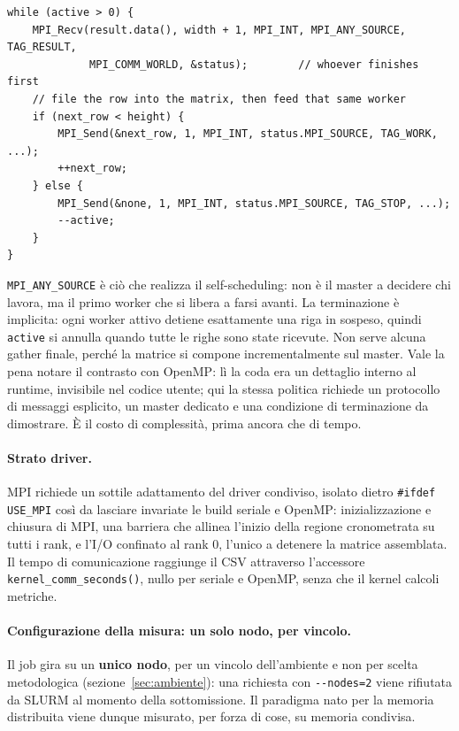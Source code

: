 \begin{verbatim}
while (active > 0) {
    MPI_Recv(result.data(), width + 1, MPI_INT, MPI_ANY_SOURCE, TAG_RESULT,
             MPI_COMM_WORLD, &status);        // whoever finishes first
    // file the row into the matrix, then feed that same worker
    if (next_row < height) {
        MPI_Send(&next_row, 1, MPI_INT, status.MPI_SOURCE, TAG_WORK, ...);
        ++next_row;
    } else {
        MPI_Send(&none, 1, MPI_INT, status.MPI_SOURCE, TAG_STOP, ...);
        --active;
    }
}
\end{verbatim}

\texttt{MPI\_ANY\_SOURCE} è ciò che realizza il self-scheduling: non è il master
a decidere chi lavora, ma il primo worker che si libera a farsi avanti. La
terminazione è implicita: ogni worker attivo detiene esattamente una riga in
sospeso, quindi \texttt{active} si annulla quando tutte le righe
sono state ricevute. Non serve alcuna gather finale, perché la matrice si compone
incrementalmente sul master. Vale la pena notare il contrasto con OpenMP: lì la
coda era un dettaglio interno al runtime, invisibile nel codice utente; qui la
stessa politica richiede un protocollo di messaggi esplicito, un master dedicato
e una condizione di terminazione da dimostrare. È il costo di complessità, prima
ancora che di tempo.

\paragraph{Strato driver.}
MPI richiede un sottile adattamento del driver condiviso, isolato dietro
\texttt{\#ifdef USE\_MPI} così da lasciare invariate le build seriale e OpenMP:
inizializzazione e chiusura di MPI, una barriera che allinea l'inizio della
regione cronometrata su tutti i rank, e l'I/O confinato al rank $0$, l'unico a
detenere la matrice assemblata. Il tempo di comunicazione raggiunge il CSV
attraverso l'accessore \texttt{kernel\_comm\_seconds()}, nullo per seriale e
OpenMP, senza che il kernel calcoli metriche.

\paragraph{Configurazione della misura: un solo nodo, per vincolo.}
Il job gira su un \textbf{unico nodo}, per un vincolo dell'ambiente e non per
scelta metodologica (sezione~\ref{sec:ambiente}): una richiesta con
\texttt{-{}-nodes=2} viene rifiutata da SLURM al momento della sottomissione. Il
paradigma nato per la memoria distribuita viene
dunque misurato, per forza di cose, su memoria condivisa.

